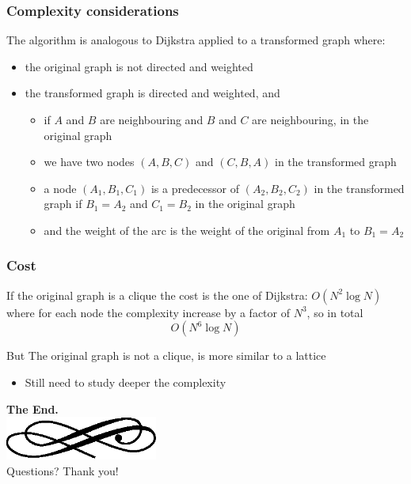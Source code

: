 \begin{frame}
  \frametitle{Complexity considerations}
  The algorithm is analogous to \alert{Dijkstra} applied to a
  \alert{transformed} graph where:\pause
  \begin{itemize}
  \item the original graph is \alert{not} directed and weighted\pause
  \item the transformed graph is \alert{directed} and weighted,
    and\pause
    \begin{itemize}
    \item if \alert{$A$} and \alert{$B$} are \alert{neighbouring} and
      \alert{$B$} and \alert{$C$} are \alert{neighbouring}, in the original graph\pause
    \item we have two nodes \alert{$(A,B,C)$} and
      \alert{$(C,B,A)$} in the transformed graph\pause
    \item a node \alert{$(A_1,B_1,C_1)$} is a predecessor of
      \alert{$(A_2,B_2,C_2)$} in the transformed graph if
      \alert{$B_1=A_2$} and \alert{$C_1=B_2$} in the original graph\pause
    \item and the weight of the arc is the weight of the original from
      \alert{$A_1$} to \alert{$B_1=A_2$}
    \end{itemize}
  \end{itemize}
\end{frame}

\begin{frame}
  \frametitle{Cost}
  If the original graph is a \alert{clique} the cost is the one of
  Dijkstra: $O(N^2\log N)$ where for each node the complexity
  increase by a factor of $N^3$, so in total
  $$
  O(N^6\log N)
  $$
  \pause
  \begin{block}{But}
    The original graph is not a \alert{clique}, is more similar to a
    lattice\pause
    \begin{itemize}
    \item Still need to study deeper the complexity
    \end{itemize}
  \end{block}
\end{frame}

\begin{frame}
  \begin{center}
	\textbf{\calligra\Huge The End.}\\
  \includegraphics[width=5cm]{img/ornament.eps}\\[1cm]
	\pause
	{\huge\calligra Questions?\pause{} Thank you!}
  \end{center}
\end{frame}
